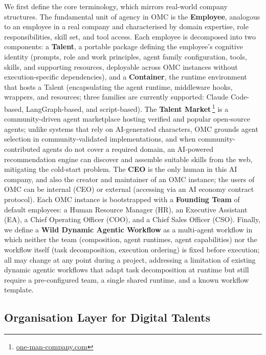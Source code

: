 \documentclass[11pt,a4paper]{article}
\begin{document}
We first define the core terminology, which mirrors real-world company structures.  The fundamental unit of agency in OMC is the \textbf{Employee}, analogous to an employee in a real company and characterised by domain expertise, role responsibilities, skill set, and tool access.  Each employee is decomposed into two components: a \textbf{Talent}, a portable package defining the employee’s cognitive identity (prompts, role and work principles, agent family configuration, tools, skills, and supporting resources, deployable across OMC instances without execution-specific dependencies), and a \textbf{Container}, the runtime environment that hosts a Talent (encapsulating the agent runtime, middleware hooks, wrappers, and resources; three families are currently supported: Claude Code-based, LangGraph-based, and script-based).  The \textbf{Talent Market}\,\footnote{\url{one-man-company.com}} is a community-driven agent marketplace hosting verified and popular open-source agents; unlike systems that rely on AI-generated characters, OMC grounds agent selection in community-validated implementations, and when community-contributed agents do not cover a required domain, an AI-powered recommendation engine can discover and assemble suitable skills from the web, mitigating the cold-start problem.  The \textbf{CEO} is the only human in this AI company, and also the creator and maintainer of an OMC instance; the users of OMC can be internal (CEO) or external (accessing via an AI economy contract protocol).  Each OMC instance is bootstrapped with a \textbf{Founding Team} of default employees: a Human Resource Manager (HR), an Executive Assistant (EA), a Chief Operating Officer (COO), and a Chief Sales Officer (CSO).  Finally, we define a \textbf{Wild Dynamic Agentic Workflow} as a multi-agent workflow in which neither the team (composition, agent runtimes, agent capabilities) nor the workflow itself (task decomposition, execution ordering) is fixed before execution; all may change at any point during a project, addressing a limitation of existing dynamic agentic workflows that adapt task decomposition at runtime but still require a pre-configured team, a single shared runtime, and a known workflow template.

\subsection{Organisation Layer for Digital Talents}
\label{sec:harness}
\end{document}
